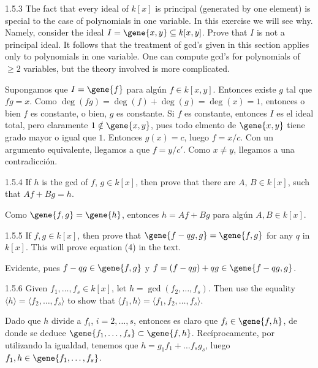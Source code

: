 \documentclass[twoside]{article}
\begin{document}
\begin{ejercicio}{1.5.3}
The fact that every ideal of $k[x]$ is principal (generated by one element) is special to the case of polynomials in one variable.
In this exercise we will see why.
Namely, consider the ideal $I=\gene{x,y} \subseteq k[x,y]$.
Prove that $I$ is not a principal ideal.
It follows that the treatment of gcd’s given in this section applies only to polynomials in one variable.
One can compute gcd’s for polynomials of $≥ 2$ variables, but the theory involved is more complicated.
\end{ejercicio}
\begin{solucion}
Supongamos que $I = \gene{f}$ para algún $f \in k[x,y]$.
Entonces existe $g$ tal que $fg = x$.
Como $\deg(fg) = \deg(f) + \deg(g) = \deg(x) = 1$, entonces o bien $f$ es constante, o bien, $g$ es constante.
Si $f$ es constante, entonces $I$ es el ideal total, pero claramente $1 \notin \gene{x,y}$, pues todo elmento de $\gene{x,y}$ tiene grado mayor o igual que $1$.
Entonces $g(x) = c$, luego $f = x/c$.
Con un argumento equivalente, llegamos a que $f = y/c'$.
Como $x \neq y$, llegamos a una contradicción.
\end{solucion}

\newpage

\begin{ejercicio}{1.5.4}
If $h$ is the gcd of $f$, $g \in k[x]$, then prove that there are $A$, $B \in k[x]$, such that $A f + B g = h$.
\end{ejercicio}
\begin{solucion}
Como $\gene{f,g} = \gene{h}$, entonces $h = A f + B g$ para algún $A, B \in k[x]$.
\end{solucion}

\newpage

\begin{ejercicio}{1.5.5}
If $f,g \in k[x]$, then prove that $\gene{f-qg,g} = \gene{f,g}$ for any $q$ in $k[x]$.
This will prove equation (4) in the text.
\end{ejercicio}
\begin{solucion}
Evidente, pues $f-qg \in \gene{f,g}$ y $f = (f-qg)+qg \in \gene{f-qg,g}$.
\end{solucion}

\newpage

\begin{ejercicio}{1.5.6}
Given $f_1,\dots , f_s ∈ k[x]$, let $h = \gcd( f_2,\dots , f_s)$. Then use the equality 
$\langle h\rangle = 
 \langle f_2,\dots , f_s\rangle$
to show that 
 $\langle f_1, h\rangle = 
 \langle f_1, f_2,\dots, f_s\rangle$.
\end{ejercicio}
\begin{solucion}
Dado que $h$ divide a $f_i$, $i=2,\dotsc,s$, entonces es claro que $f_i\in\gene{f,h}$, de donde se deduce $\gene{f_1,\dotsc,f_s}\subset \gene{f,h}$. Recíprocamente, por utilizando la igualdad, tenemos que $h=g_1f_1+\dotsc f_sg_s$, luego $f_1,h\in\gene{f_1,\dotsc,f_s}$. 
\end{solucion}
\end{document}
